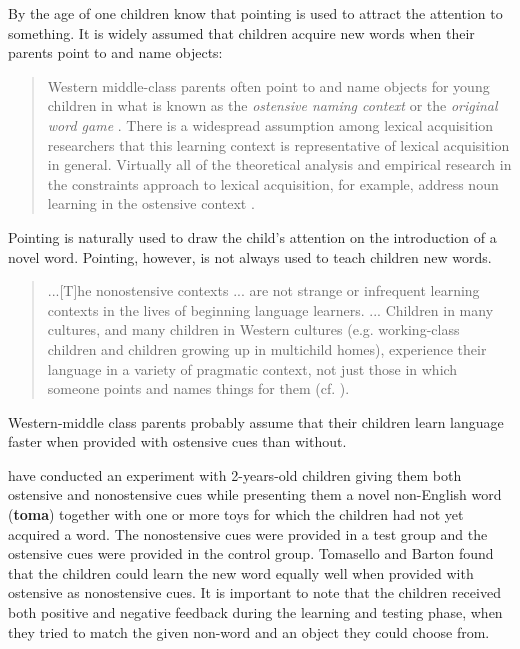 By the age of one children know that pointing is used to attract the attention to something. It is widely assumed that children acquire new words when their parents point to and name objects:

\begin{quote}
Western middle-class parents often point to and name objects for young children in what is known as the {\em ostensive naming context} or the {\em original word game} \cite{brown:1958}. There is a widespread assumption among lexical acquisition researchers that this learning context is representative of lexical acquisition in general. Virtually all of the theoretical analysis and empirical research in the constraints approach to lexical acquisition, for example, address noun learning in the ostensive context \cite{markman:1989}.\cite[p. 639]{tomasellobarton:1994}
\end{quote}

Pointing is naturally used to draw the child's attention on the introduction of a novel word. Pointing, however, is not always used to teach children new words.

\begin{quote}
...[T]he nonostensive contexts ... are not strange or infrequent learning contexts in the lives of beginning language learners. ... Children in many cultures, and many children in Western cultures (e.g. working-class children and children growing up in multichild homes), experience their language in a variety of pragmatic context, not just those in which someone points and names things for them (cf. \cite{bartontomasello:1994,schieffelinochs:1989}). \cite[p. 649]{tomasellobarton:1994}
\end{quote}

Western-middle class parents probably assume that their children learn language faster when provided with ostensive cues than without. 

 have conducted an experiment with 2-years-old children giving them both ostensive and nonostensive cues while presenting them a novel non-English word ({\bf toma}) together with one or more toys for which the children had not yet acquired a word. The nonostensive cues were provided in a test group and the ostensive cues were provided in the control group. Tomasello and Barton found that the children could learn the new word equally well when provided with ostensive as nonostensive cues. It is important to note that the children received both positive and negative feedback during the learning and testing phase, when they tried to match the given non-word and an object they could choose from.

